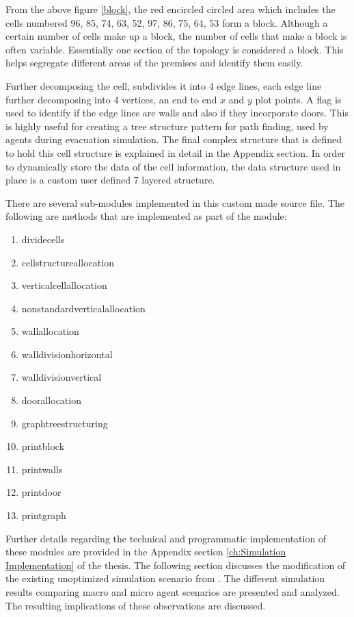 From the above figure \ref{block}, the red encircled circled area which includes the cells numbered 96, 85, 74, 63, 52, 97, 86, 75, 64, 53 form a block. Although a certain number of cells make up a block, the number of cells that make a block is often variable. Essentially one section of the topology is considered a block. This helps segregate different areas of the premises and identify them easily.

Further decomposing the cell, subdivides it into 4 edge lines, each edge line further decomposing into 4 vertices, an end to end $x$ and $y$ plot points. A flag is used to identify if the edge lines are walls and also if they incorporate doors. This is highly useful for creating a tree structure pattern for path finding, used by agents during evacuation simulation. The final complex structure that is defined to hold this cell structure is explained in detail in the Appendix section. In order to dynamically store the data of the cell information, the data structure used in place is a custom user defined 7 layered structure. 

There are several sub-modules implemented in this custom made source file. The following are methods that are implemented as part of the module:

\begin{enumerate}
  \item divide\textunderscore cells
  \item cell\textunderscore structure\textunderscore allocation
  \item vertical\textunderscore cell\textunderscore allocation
  \item non\textunderscore standard\textunderscore vertical\textunderscore allocation
  \item wall\textunderscore allocation
  \item wall\textunderscore division\textunderscore horizontal
  \item wall\textunderscore division\textunderscore vertical
  \item door\textunderscore allocation
  \item graph\textunderscore tree\textunderscore structuring
  \item print\textunderscore block
  \item print\textunderscore walls
  \item print\textunderscore door
  \item print\textunderscore graph
\end{enumerate}

Further details regarding the technical and programmatic implementation of these modules are provided in the Appendix section \ref{ch:Simulation Implementation} of the thesis. The following section discusses the modification of the existing unoptimized simulation scenario from \cite{ref5}. The different simulation results comparing macro and micro agent scenarios are presented and analyzed. The resulting implications of these observations are discussed. 
